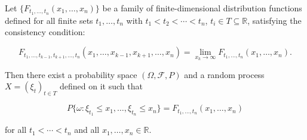 Let $\{F_{t_1, \ldots, t_n}(x_1, \ldots, x_n)\}$ be a family of finite-dimensional distribution functions defined for all finite sets $t_1, \ldots, t_n$ with $t_1 < t_2 < \cdots < t_n$, $t_i \in T \subseteq \mathbb{R}$, satisfying the consistency condition:

$$F_{t_1, \ldots, t_{k-1}, t_{k+1}, \ldots, t_n}(x_1, \ldots, x_{k-1}, x_{k+1}, \ldots, x_n) = \lim_{x_k \to \infty} F_{t_1, \ldots, t_n}(x_1, \ldots, x_n).$$

Then there exist a probability space $(\Omega, \mathcal{F}, P)$ and a random process $X = (\xi_t)_{t \in T}$ defined on it such that

$$P\{\omega : \xi_{t_1} \leq x_1, \ldots, \xi_{t_n} \leq x_n\} = F_{t_1, \ldots, t_n}(x_1, \ldots, x_n)$$

for all $t_1 < \cdots < t_n$ and all $x_1, \ldots, x_n \in \mathbb{R}$.
